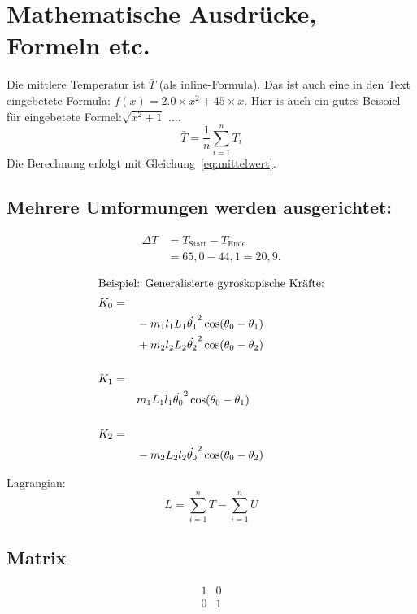 \documentclass{scrartcl}
\begin{document}
\section{Mathematische Ausdrücke, Formeln etc.}
Die mittlere Temperatur ist $\bar T$ (als inline-Formula). Das ist auch eine in den Text eingebetete Formula: $f(x) = 2.0 \times x^2+45 \times x$. Hier is auch ein gutes Beisoiel für eingebetete Formel:\(\sqrt{x^2+1}\)
....
\begin{equation}\label{eq:mittelwert}
  \bar T = \frac{1}{n}\sum_{i=1}^{n}T_i
\end{equation}
Die Berechnung erfolgt mit Gleichung~\eqref{eq:mittelwert}.\\


\subsection*{Mehrere Umformungen werden ausgerichtet:}
\begin{align*} %
  \Delta T &= T_{\mathrm{Start}}-T_{\mathrm{Ende}} \\
           &= 65{,}0-44{,}1 = 20{,}9.
\end{align*}

\begin{align}
	\intertext{Beispiel: Generalisierte gyroskopische Kräfte:}
	K_0=\\
	&\quad -m_1 l_1 L_1 \dot{\theta_1}^2 \cos (\theta_0-\theta_1)\nonumber\\ 
	&\quad + m_2 l_2 L_2 \dot{\theta_2}^2 \cos (\theta_0-\theta_2)\nonumber\\ \nonumber\\
	K_1=\\
	&\quad m_1 L_1 l_1 \dot{\theta_0}^2 \cos (\theta_0-\theta_1)\nonumber\\ \nonumber\\
	K_2=\\
	&\quad -m_2 L_2 l_2 \dot{\theta_0}^2 \cos (\theta_0-\theta_2)\nonumber
\end{align}

Lagrangian:
\[
L=\sum_{i=1}^{n}T - \sum_{i=1}^{n}U
\]

\subsection*{Matrix}
\[
	\begin{matrix}
		1 & 0\\
		0 & 1
	\end{matrix}
\]
\end{document}
